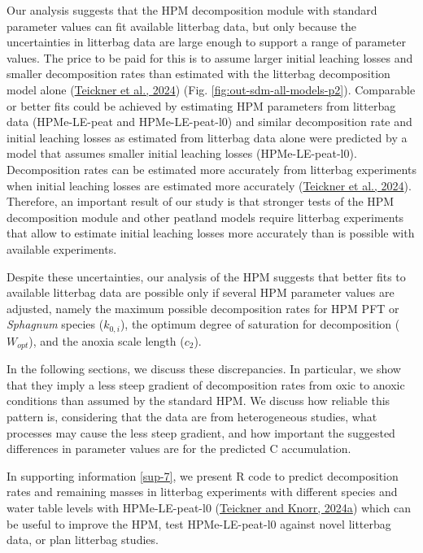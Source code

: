 \documentclass[
  12pt,
]{article}
\begin{document}
Our analysis suggests that the HPM decomposition module with standard parameter values can fit available litterbag data, but only because the uncertainties in litterbag data are large enough to support a range of parameter values. The price to be paid for this is to assume larger initial leaching losses and smaller decomposition rates than estimated with the litterbag decomposition model alone (\protect\hyperlink{ref-Teickner.2024}{Teickner et al., 2024}) (Fig. \ref{fig:out-sdm-all-models-p2}). Comparable or better fits could be achieved by estimating HPM parameters from litterbag data (HPMe-LE-peat and HPMe-LE-peat-l0) and similar decomposition rate and initial leaching losses as estimated from litterbag data alone were predicted by a model that assumes smaller initial leaching losses (HPMe-LE-peat-l0). Decomposition rates can be estimated more accurately from litterbag experiments when initial leaching losses are estimated more accurately (\protect\hyperlink{ref-Teickner.2024}{Teickner et al., 2024}). Therefore, an important result of our study is that stronger tests of the HPM decomposition module and other peatland models require litterbag experiments that allow to estimate initial leaching losses more accurately than is possible with available experiments.

Despite these uncertainties, our analysis of the HPM suggests that better fits to available litterbag data are possible only if several HPM parameter values are adjusted, namely the maximum possible decomposition rates for HPM PFT or \emph{Sphagnum} species (\(k_{0,i}\)), the optimum degree of saturation for decomposition (\(W_{opt}\)), and the anoxia scale length (\(c_2\)).

In the following sections, we discuss these discrepancies. In particular, we show that they imply a less steep gradient of decomposition rates from oxic to anoxic conditions than assumed by the standard HPM. We discuss how reliable this pattern is, considering that the data are from heterogeneous studies, what processes may cause the less steep gradient, and how important the suggested differences in parameter values are for the predicted C accumulation.

In supporting information \ref{sup-7}, we present R code to predict decomposition rates and remaining masses in litterbag experiments with different species and water table levels with HPMe-LE-peat-l0 (\protect\hyperlink{ref-Teickner.2024b}{Teickner and Knorr, 2024a}) which can be useful to improve the HPM, test HPMe-LE-peat-l0 against novel litterbag data, or plan litterbag studies.
\end{document}
